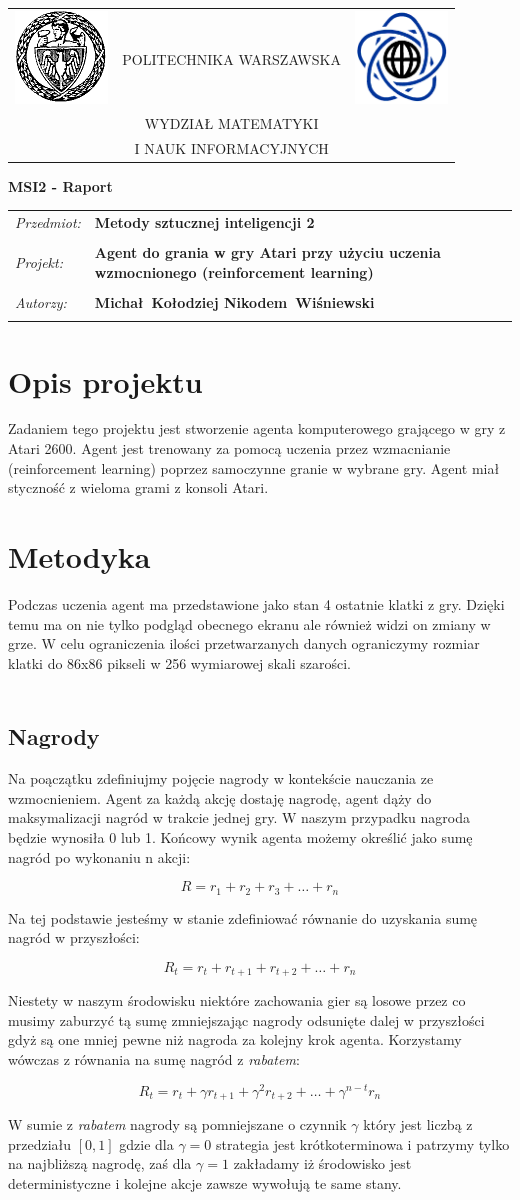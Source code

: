 \documentclass[12pt]{article}
\renewcommand{\maketitle}{
\begin{titlepage}
\begin{table}[t]
\centering
\begin{tabular}[t]{lcr}
 \includegraphics[width=70pt,height=70pt]{PW} & POLITECHNIKA WARSZAWSKA & \includegraphics[width=70pt,height=70pt]{MiNI}\\
& WYDZIAŁ MATEMATYKI & \\
& I NAUK INFORMACYJNYCH &
\end{tabular}
\end{table}
\vspace*{3cm}
  \begin{center}
    \LARGE
    \textbf {MSI2 - Raport}\\
   \vspace*{2 cm}
\begin{table}[!htp]
\begin{tabular}{p{4cm}p{9cm}}
\textit{Przedmiot:} &\textbf {Metody sztucznej inteligencji 2} \\
\\
\textit{Projekt:} &\textbf {Agent do grania w gry Atari przy użyciu uczenia wzmocnionego (reinforcement learning)} \\
\\
\textit{Autorzy:} &\textbf {Michał~Kołodziej \newline Nikodem~Wiśniewski} \\
\\
\end{tabular}
\end{table}

\vspace{5 cm}
  \center{\small Warszawa, dnia \today}
\end{center}
\end{titlepage}
}
\begin{document}
\maketitle


\section{Opis projektu}
Zadaniem tego projektu jest stworzenie agenta komputerowego grającego w gry z Atari 2600. Agent jest trenowany za pomocą uczenia przez wzmacnianie (reinforcement learning) poprzez samoczynne granie w wybrane gry. Agent miał styczność z wieloma grami z konsoli Atari.

\section{Metodyka}

Podczas uczenia agent ma przedstawione jako stan 4 ostatnie klatki z gry. Dzięki temu ma on nie tylko podgląd obecnego ekranu ale również widzi on zmiany w grze. W celu ograniczenia ilości przetwarzanych danych ograniczymy rozmiar klatki do 86x86 pikseli w 256 wymiarowej skali szarości.
\\\

\subsection{Nagrody}

Na poączątku zdefiniujmy pojęcie nagrody w kontekście nauczania ze wzmocnieniem. Agent za każdą akcję dostaję nagrodę, agent dąży do maksymalizacji nagród w trakcie jednej gry. W naszym przypadku nagroda będzie wynosiła 0 lub 1. Końcowy wynik agenta możemy określić jako sumę nagród po wykonaniu n akcji:

$$R=r_1 + r_2 + r_3 + \dots + r_n$$

Na tej podstawie jesteśmy w stanie zdefiniować równanie do uzyskania sumę nagród w przyszłości:

$$R_t=r_t + r_{t+1}+ r_{t+2} + \dots + r_n$$

Niestety w naszym środowisku niektóre zachowania gier są losowe przez co musimy zaburzyć tą sumę zmniejszając nagrody odsunięte dalej w przyszłości gdyż są one mniej pewne niż nagroda za kolejny krok agenta. Korzystamy wówczas z równania na sumę nagród z \textit{rabatem}:

$$R_t=r_t + \gamma r_{t+1}+  \gamma^2 r_{t+2} + \dots + \gamma^{n-t}r_n$$

W sumie z \textit{rabatem} nagrody są pomniejszane o czynnik $\gamma$ który jest liczbą z przedziału $[0,1]$ gdzie dla $\gamma =0$ strategia jest krótkoterminowa i patrzymy tylko na najbliższą nagrodę, zaś dla $\gamma =1$ zakładamy iż środowisko jest deterministyczne i kolejne akcje zawsze wywołują te same stany.
\end{document}
